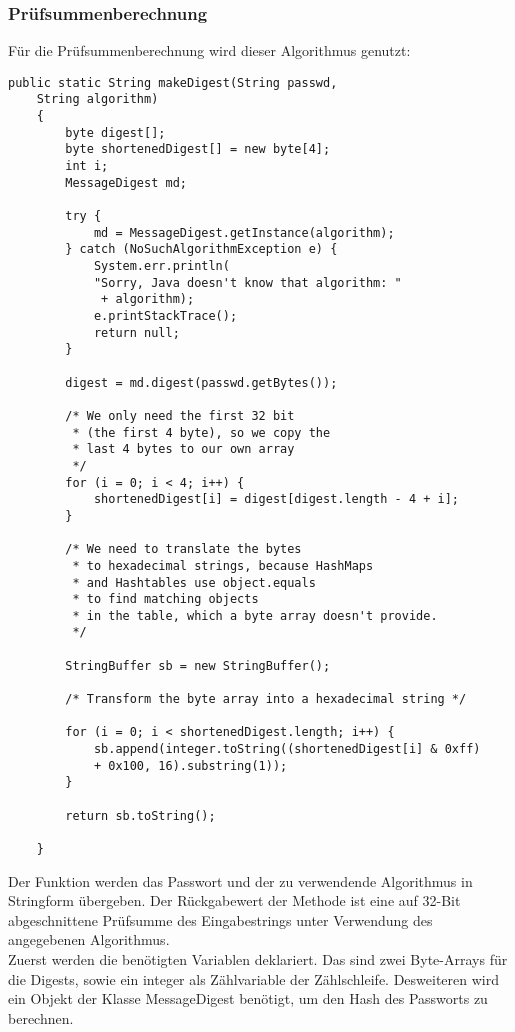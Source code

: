 \documentclass[11pt]{article}
\begin{document}
\subsubsection{Prüfsummenberechnung}
Für die Prüfsummenberechnung wird dieser Algorithmus genutzt: 
\begin{lstlisting}[caption=Algorithmus zur Prüfsummenberechnung, label=lst:makeDigest]
    public static String makeDigest(String passwd, 
    String algorithm) 
    {
        byte digest[];
        byte shortenedDigest[] = new byte[4];
        int i;
        MessageDigest md;
        
        try {
            md = MessageDigest.getInstance(algorithm);
        } catch (NoSuchAlgorithmException e) {
            System.err.println(
            "Sorry, Java doesn't know that algorithm: "
             + algorithm);
            e.printStackTrace();
            return null;
        }
        
        digest = md.digest(passwd.getBytes());
        
        /* We only need the first 32 bit 
         * (the first 4 byte), so we copy the
         * last 4 bytes to our own array
         */
        for (i = 0; i < 4; i++) {
            shortenedDigest[i] = digest[digest.length - 4 + i];
        }
        
        /* We need to translate the bytes 
         * to hexadecimal strings, because HashMaps
         * and Hashtables use object.equals 
         * to find matching objects
         * in the table, which a byte array doesn't provide.
         */
         
        StringBuffer sb = new StringBuffer();
        
        /* Transform the byte array into a hexadecimal string */
        
        for (i = 0; i < shortenedDigest.length; i++) {
            sb.append(integer.toString((shortenedDigest[i] & 0xff) 
            + 0x100, 16).substring(1));
        }
        
        return sb.toString();

    }
\end{lstlisting}
Der Funktion werden das Passwort und der zu verwendende Algorithmus in Stringform übergeben.
Der Rückgabewert der Methode ist eine auf 32-Bit abgeschnittene Prüfsumme des Eingabestrings unter Verwendung des angegebenen Algorithmus.\\
Zuerst werden die benötigten Variablen deklariert. Das sind zwei Byte-Arrays für die Digests, sowie ein integer als Zählvariable der Zählschleife. Desweiteren wird ein Objekt der Klasse MessageDigest benötigt, um den Hash des Passworts zu berechnen. \\
\end{document}
